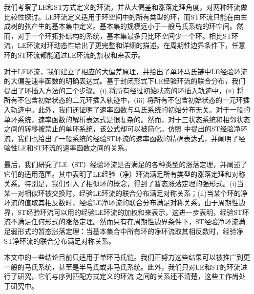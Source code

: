 我们考察了LE和ST方式定义的环流，并从大偏差和涨落定理角度，对两种环流做比较性探讨。LE环流定义适用于环空间中的所有类型的环，而ST环流只能在由生成树的弦产生的基本集中定义。基本集的规模远小于一般马氏系统的环空间。然而，对于一个环拓扑结构的系统，基本集最多只比环空间少一个环。相比ST环流，LE环流对环动态性给出了更完整和详细的描述。在周期性边界条件下，任意环的ST环流都能通过LE环流的加权和来表示。

对于LE环流，我们建立了相应的大偏差原理，并给出了单环马氏链中LE经验环流的大偏差速率函数的明确表达式。基于封闭形式下LE经验环流的联合分布，我们提出了环插入方法的三个步骤。(i) 将所有经过初始状态的环插入轨迹中，(ii) 将所有不包含初始状态的二元环插入轨迹中，(iii) 将所有不包含初始状态的一元环插入轨迹中。此外，我们还证明了速率函数与马氏系统的初始分布无关。对于一般的单环系统，速率函数的解析表达式是很复杂的。然而，对于三状态系统和相邻状态之间的转移被禁止的单环系统，该公式却可以被简化。仿照 \cite{bertini2015flows} 中提出的ST经验净环流，我们也给出了一般系统的经验ST环流的速率函数的精确表达式，并阐明了经验性LE和ST环流的速率函数之间的关系。

最后，我们研究了LE（ST）经验环流是否满足的各种类型的涨落定理，并阐述了它们的适用范围。其中表明了LE经验（净）环流满足所有类型的涨落定理和对称关系。特别是，我们引入了相似环的概念，得到了暂态涨落定理的强形式。(i)当某一对相似环被交换时，经验LE环流的联合分布满足对称关系；(ii)当某个环的净环流的值取其相反数时，经验LE净环流的联合分布满足对称关系。由于周期性边界，ST经验环流可以用的经验LE环流的加权和来表示，这进一步表明，经验ST环流不满足任何形式的涨落定理。然而只有在周期性边界条件下，ST经验净环流满足弱形式的暂态涨落定理：当基本集合中所有环的净环流取其相反数时，经验净ST净环流的联合分布满足对称关系。

本文中的一些结论目前只适用于单环马氏链。我们正努力这些结果可以被推广到更一般的马氏系统，甚至是半马氏或非马氏系统。此外，我们只对LE和ST的环流进行了研究，它们与序列匹配方式定义的环流 \cite{roldan2019exact,biddle2020reversal,pietzonka2021cycle} 之间的关系还不清楚，这些工作尚处于研究中。